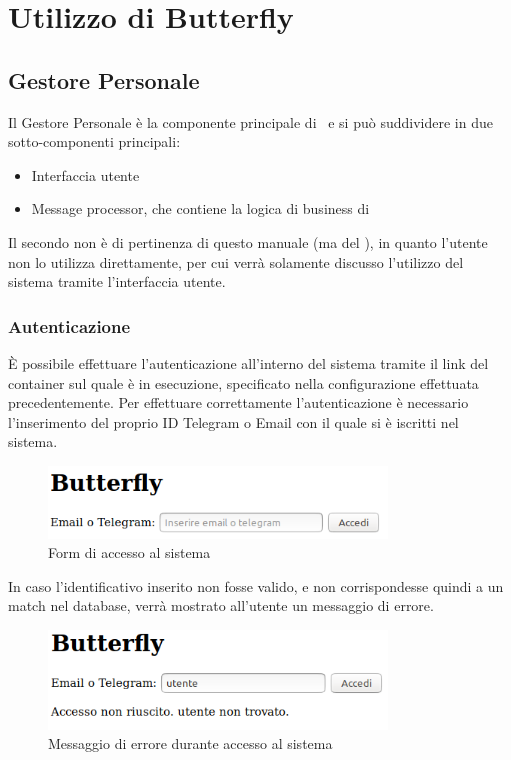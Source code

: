 \section{Utilizzo di Butterfly}\label{utilizzo}

\subsection{Gestore Personale}

Il Gestore Personale è la componente principale di \progetto\ e si può suddividere in due sotto-componenti principali:

\begin{itemize}
    \item Interfaccia utente
    \item Message processor, che contiene la logica di business di \progetto
\end{itemize}

Il secondo non è di pertinenza di questo manuale (ma del \MSd), in quanto l'utente non lo utilizza direttamente, per cui verrà solamente discusso l'utilizzo del sistema tramite l'interfaccia utente.

\subsubsection{Autenticazione}
È possibile effettuare l'autenticazione all'interno del sistema tramite il link del container sul quale è in esecuzione, specificato nella configurazione effettuata precedentemente.
Per effettuare correttamente l'autenticazione è necessario l'inserimento del proprio ID Telegram o Email con il quale si è iscritti nel sistema.
\begin{figure}[H]
	\centering
	\includegraphics[width=9cm]{img/accesso_1.png}
	\caption{Form di accesso al sistema}
\end{figure}
In caso l'identificativo inserito non fosse valido, e non corrispondesse quindi a un match nel database, verrà mostrato all'utente un messaggio di errore.
\begin{figure}[H]
	\centering
	\includegraphics[width=9cm]{img/accesso_2.png}
	\caption{Messaggio di errore durante accesso al sistema}
\end{figure}

